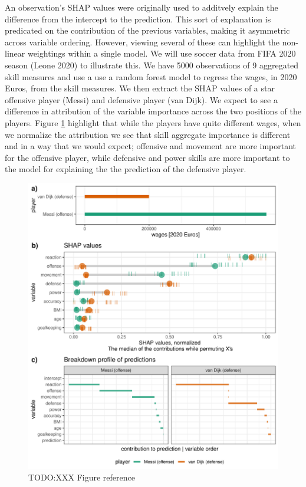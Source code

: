 \documentclass[
]{article}
\begin{document}
An observation's SHAP values were originally used to additvely explain the difference from the intercept to the prediction. This sort of explanation is predicated on the contribution of the previous variables, making it asymmetric across variable ordering. However, viewing several of these can highlight the non-linear weightings within a single model. We will use soccer data from FIFA 2020 season (Leone 2020) to illustrate this. We have 5000 observations of 9 aggregated skill measures and use a use a random forest model to regress the wages, in 2020 Euros, from the skill measures. We then extract the SHAP values of a star offensive player (Messi) and defensive player (van Dijk). We expect to see a difference in attribution of the variable importance across the two positions of the players. Figure \ref{fig:shapdistrbd} highlight that while the players have quite different wages, when we normalize the attribution we see that skill aggregate importance is different and in a way that we would expect; offensive and movement are more important for the offensive player, while defensive and power skills are more important to the model for explaining the the prediction of the defensive player.



\begin{figure}

{\centering \includegraphics{./figures/shap_distr_bd} 

}

\caption{TODO:XXX Figure reference}\label{fig:shapdistrbd}
\end{figure}
\end{document}
